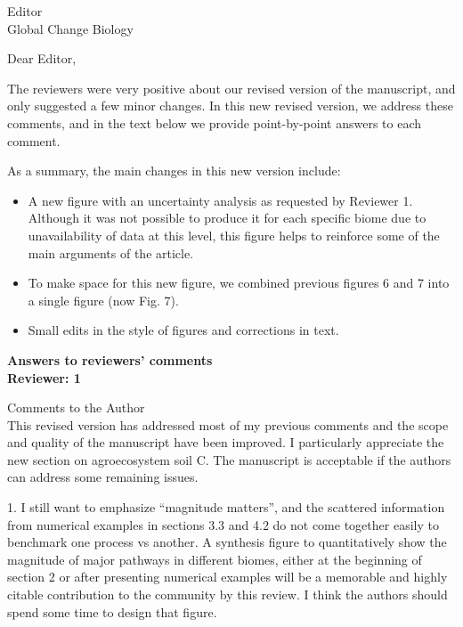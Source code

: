 \documentclass[11pt]{bgcletter}
\newcommand{\answer}[1] {
{\color{cyan} #1}
}
\begin{document}
\begin{letter}{Editor\\
   Global Change Biology
}
\opening{Dear Editor,}
The reviewers were very positive about our revised version of the manuscript, and only suggested a few minor changes. 
In this new revised version, we address these comments, and in the text below we provide point-by-point \answer{answers} to each comment. 

As a summary, the main changes in this new version include:
\begin{itemize}
\item A new figure with an uncertainty analysis as requested by Reviewer 1. Although it was not possible to produce it for each specific biome due to unavailability of data at this level, this figure helps to reinforce some of the main arguments of the article.
\item To make space for this new figure, we combined previous figures 6 and 7 into a single figure (now Fig. 7). 
\item Small edits in the style of figures and corrections in text.
\end{itemize}

\textbf{Answers to reviewers' comments} \\
\textbf{Reviewer: 1}

Comments to the Author \\
This revised version has addressed most of my previous comments and the scope and quality of the manuscript have been improved. I particularly appreciate the new section on agroecosystem soil C. The manuscript is acceptable if the authors can address some remaining issues.

1. I still want to emphasize ``magnitude matters'', and the scattered information from numerical examples in sections 3.3 and 4.2 do not come together easily to benchmark one process vs another. A synthesis figure to quantitatively show the magnitude of major pathways in different biomes, either at the beginning of section 2 or after presenting numerical examples will be a memorable and highly citable contribution to the community by this review. I think the authors should spend some time to design that figure.


\end{letter}
\end{document}

